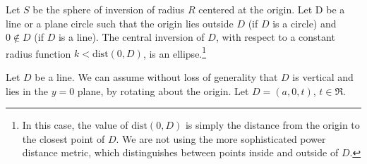\begin{theorem}
\label{thm-conic}
Let $S$ be the sphere of inversion of radius $R$ centered at the origin.
Let D be a line or a plane circle such that the origin
lies outside $D$ (if $D$ is a circle) and $0 \not \in D$ (if $D$ is a line).
The central inversion of $D$, with respect to a constant radius function
$k < \mbox{dist}(0,D)$, is an ellipse.\footnote{In this case, the value of 
	$\mbox{dist}(0,D)$ is simply 
	the distance from the origin to the closest point of $D$.
	We are not using the more sophisticated power distance metric, 
	which distinguishes between points inside and outside of $D$.}
\end{theorem}
Let $D$ be a line.
We can assume without loss of generality that $D$
is vertical and lies in the $y=0$ plane, 
by rotating about the origin.
Let $D = (a,0,t)$, $t \in \Re$.

